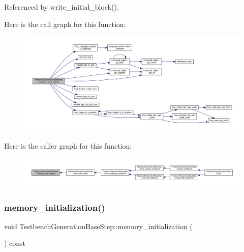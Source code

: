 Referenced by write\+\_\+initial\+\_\+block().

Here is the call graph for this function\+:
\nopagebreak
\begin{figure}[H]
\begin{center}
\leavevmode
\includegraphics[width=350pt]{dc/d02/classTestbenchGenerationBaseStep_ab4bb94d28070dd729e236fbb1810c356_cgraph}
\end{center}
\end{figure}
Here is the caller graph for this function\+:
\nopagebreak
\begin{figure}[H]
\begin{center}
\leavevmode
\includegraphics[width=350pt]{dc/d02/classTestbenchGenerationBaseStep_ab4bb94d28070dd729e236fbb1810c356_icgraph}
\end{center}
\end{figure}
\mbox{\label{classTestbenchGenerationBaseStep_abf62b47a373a3fcd67d892b8f92e0bd9}} 
\subsubsection{\texorpdfstring{memory\+\_\+initialization()}{memory\_initialization()}}
{\footnotesize\ttfamily void Testbench\+Generation\+Base\+Step\+::memory\+\_\+initialization (\begin{DoxyParamCaption}{ }\end{DoxyParamCaption}) const\hspace{0.3cm}{\ttfamily [protected]}}



